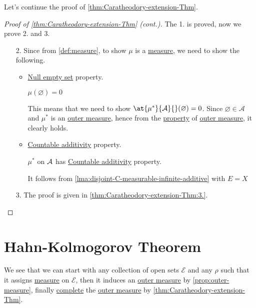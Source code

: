 Let's continue the proof of \autoref{thm:Caratheodory-extension-Thm}.
\begin{proof}[Proof of \autoref{thm:Caratheodory-extension-Thm} (cont.)]\label{pf:Caratheodory-extension-Thm-cont}
	The 1. is proved, now we prove 2. and 3.
	\begin{enumerate}[(1)]
		\item[2.] Since from \autoref{def:measure}, to show \(\mu \) is a \hyperref[def:measure]{measure}, we need to show the following.
			\begin{itemize}
				\item \hyperref[def:measure-null-empty-set]{Null empty set} property.
				      \begin{claim}
					      \(\mu (\varnothing ) = 0\)
				      \end{claim}
				      \begin{explanation}
					      This means that we need to show \(\at{\mu^{*} }{\mathcal{A}}{}(\varnothing ) = 0\). Since \(\varnothing \in \mathcal{A} \) and \(\mu^{*}\) is
					      an \hyperref[def:outer-measure]{outer measure}, hence from the \hyperref[def:outer-measure-null-empty-set]{property} of \hyperref[def:outer-measure]{outer measure}, it clearly holds.
				      \end{explanation}
				\item \hyperref[def:measure-countable-additivity]{Countable additivity} property.
				      \begin{claim}
					      \(\mu ^{*} \) on \(\mathcal{\MakeUppercase{a}} \) has \hyperref[def:measure-countable-additivity]{Countable additivity} property.
				      \end{claim}
				      \begin{explanation}
					      It follows from \autoref{lma:disjoint-C-measurable-infinite-additive} with \(E = X\)
				      \end{explanation}
			\end{itemize}
		\item[3.] The proof is given in \autoref{thm:Caratheodory-extension-Thm:3.}.
	\end{enumerate}
\end{proof}

\section{Hahn-Kolmogorov Theorem}
We see that we can start with any collection of open sets \(\mathcal{E}\) and any \(\rho\) such that it assigns \hyperref[def:measure]{measure} on \(\mathcal{E}\), then it induces an
\hyperref[def:outer-measure]{outer measure} by \autoref{prop:outer-measure}, finally \hyperref[def:complete-measure-space]{complete} the \hyperref[def:outer-measure]{outer measure} by \autoref{thm:Caratheodory-extension-Thm}.

